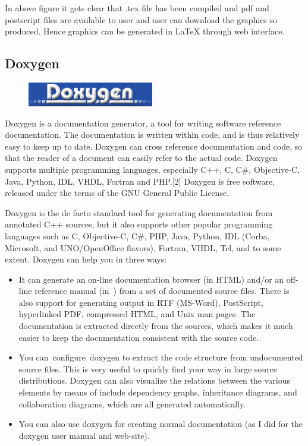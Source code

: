 \noindent In above figure it gets clear that .tex file has been compiled and pdf and postscript files
are available to user and user can download the graphics so produced. Hence graphics
can be generated in \LaTeX{} through web interface.

\subsection{Doxygen}
\begin{figure}[h]
	\centering \includegraphics[scale=1]{images/doxygen.jpg}
\end{figure}
Doxygen is a documentation generator, a tool for writing software reference documentation. The documentation is written within code, and is thus relatively easy to keep up to date. Doxygen can cross reference documentation and code, so that the reader of a document can easily refer to the actual code.
Doxygen supports multiple programming languages, especially C++, C, C\#, Objective-C, Java, Python, IDL, VHDL, Fortran and PHP.[2] Doxygen is free software, released under the terms of the GNU General Public License.

Doxygen is the de facto standard tool for generating documentation from annotated C++ sources, but it also supports other popular programming languages such as C, Objective-C, C\#, PHP, Java, Python, IDL (Corba, Microsoft, and UNO/OpenOffice flavors), Fortran, VHDL, Tcl, and to some extent.
Doxygen can help you in three ways:

\begin{itemize}
	\item It can generate an on-line documentation browser (in HTML) and/or an off-line reference manual (in ) from a set of documented source files. There is also support for generating output in RTF (MS-Word), PostScript, hyperlinked PDF, compressed HTML, and Unix man pages. The documentation is extracted directly from the sources, which makes it much easier to keep the documentation consistent with the source code.
	\item You can configure doxygen to extract the code structure from undocumented source files. This is very useful to quickly find your way in large source distributions. Doxygen can also visualize the relations between the various elements by means of include dependency graphs, inheritance diagrams, and collaboration diagrams, which are all generated automatically.
	\item You can also use doxygen for creating normal documentation (as I did for the doxygen user manual and web-site).
\end{itemize}

